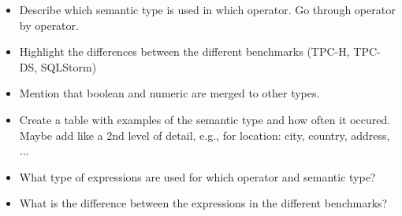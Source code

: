 \begin{itemize}
\item Describe which semantic type is used in which operator. Go through operator by operator.
\item Highlight the differences between the different benchmarks (TPC-H, TPC-DS, SQLStorm)
\item Mention that boolean and numeric are merged to other types. 
\item Create a table with examples of the semantic type and how often it occured. Maybe add like a 2nd level of detail, e.g., for location: city, country, address, ...
\item What type of expressions are used for which operator and semantic type? 
\item What is the difference between the expressions in the different benchmarks?
\end{itemize}
